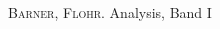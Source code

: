 \documentclass[ngerman,titlepage,twoside, parskip=half*]{scrreprt}
\theoremstyle{plain}
\theoremstyle{definition}
\theoremstyle{remark}
\begin{document}
\clearpage
\begin{thebibliography}{99}

  \textsc{Barner}, \textsc{Flohr}. Analysis, Band I
\end{thebibliography}

\printindex
\end{document}
